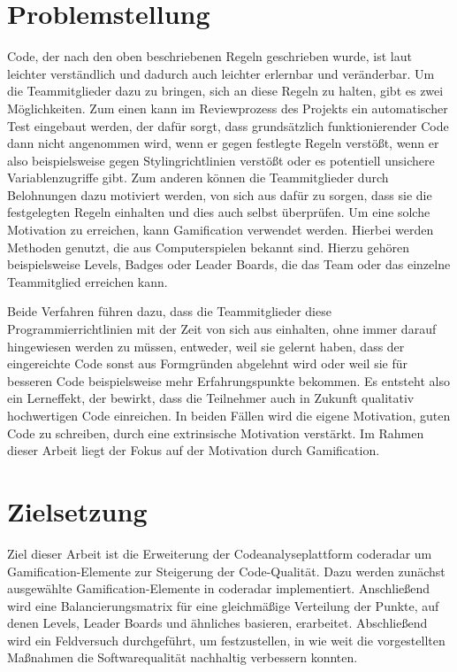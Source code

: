 \documentclass[fontsize=11pt, paper=a4, parskip=half]{scrartcl}
\begin{document}
\section{Problemstellung}
Code, der nach den oben beschriebenen Regeln geschrieben wurde, ist laut \cite{PJ2015} leichter verständlich und dadurch auch leichter erlernbar und veränderbar.
Um die Teammitglieder dazu zu bringen, sich an diese Regeln zu halten, gibt es zwei Möglichkeiten.
Zum einen kann im Reviewprozess des Projekts ein automatischer Test eingebaut werden, der dafür sorgt, dass grundsätzlich funktionierender Code dann nicht angenommen wird, wenn er gegen festlegte Regeln verstößt, wenn er also beispielsweise gegen Stylingrichtlinien verstößt oder es potentiell unsichere Variablenzugriffe gibt.
Zum anderen können die Teammitglieder durch Belohnungen dazu motiviert werden, von sich aus dafür zu sorgen, dass sie die festgelegten Regeln einhalten und dies auch selbst überprüfen. 
Um eine solche Motivation zu erreichen, kann Gamification verwendet werden.
Hierbei werden Methoden genutzt, die aus Computerspielen bekannt sind.
Hierzu gehören beispielsweise Levels, Badges oder Leader Boards, die das Team oder das einzelne Teammitglied erreichen kann. 

Beide Verfahren führen dazu, dass die Teammitglieder diese Programmierrichtlinien mit der Zeit von sich aus einhalten, ohne immer darauf hingewiesen werden zu müssen, entweder, weil sie gelernt haben, dass der eingereichte Code sonst aus Formgründen abgelehnt wird oder weil sie für besseren Code beispielsweise mehr Erfahrungspunkte bekommen.
Es entsteht also ein Lerneffekt, der bewirkt, dass die Teilnehmer auch in Zukunft qualitativ hochwertigen Code einreichen.
In beiden Fällen wird die eigene Motivation, guten Code zu schreiben, durch eine extrinsische Motivation verstärkt.
Im Rahmen dieser Arbeit liegt der Fokus auf der Motivation durch Gamification.


\section{Zielsetzung}
Ziel dieser Arbeit ist die Erweiterung der Codeanalyseplattform coderadar um Gamification-Elemente zur Steigerung der Code-Qualität.
Dazu werden zunächst ausgewählte Gamification-Elemente in coderadar implementiert.
Anschließend wird eine Balancierungsmatrix für eine gleichmäßige Verteilung der Punkte, auf denen Levels, Leader Boards und ähnliches basieren, erarbeitet.
Abschließend wird ein Feldversuch durchgeführt, um festzustellen, in wie weit die vorgestellten Maßnahmen die Softwarequalität nachhaltig verbessern konnten.
\end{document}
